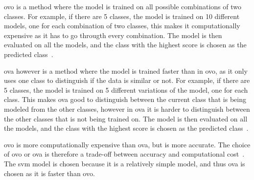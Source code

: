 

\gls{ovo} is a method where the model is trained on all possible combinations of two classes. For example, if there are 5 classes, the model is trained on 10 different models, one for each combination of two classes, this makes it computationally expensive as it has to go througth every combination. The model is then evaluated on all the models, and the class with the highest score is chosen as the predicted class~\cite{james-statistical-learning}.

\gls{ova} however is a method where the model is trained faster than in \gls{ovo}, as it only uses one class to distinguish if the data is similar or not. For example, if there are 5 classes, the model is trained on 5 different variations of the model, one for each class. This makes \gls{ova} good to distinguish between the current class that is being modeled from the other classes, however in \gls{ova} it is harder to distinguish between the other classes that is not being trained on. The model is then evaluated on all the models, and the class with the highest score is chosen as the predicted class~\cite{james-statistical-learning}.

\gls{ovo} is more computationally expensive than \gls{ova}, but is more accurate. The choice of \gls{ovo} or \gls{ova} is therefore a trade-off between accuracy and computational cost~\cite{james-statistical-learning}. The \gls{svm} model is chosen because it is a relatively simple model, and thus \gls{ova} is chosen as it is faster than \gls{ovo}.



